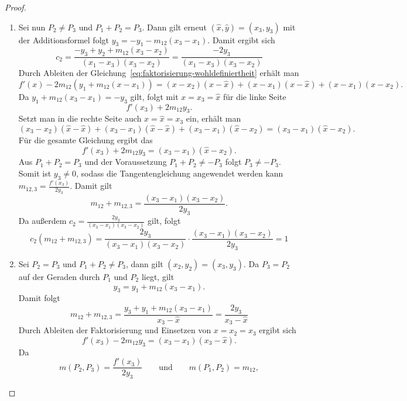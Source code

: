 \begin{proof}
\begin{enumerate}
        \item Sei nun $P_2\neq P_3$ und $P_1+P_2=P_3$. Dann gilt erneut $(\hat{x},\hat{y})=(x_3,y_3)$ mit der Additionsformel folgt $y_3=-y_1-m_{12}(x_3-x_1)$. Damit ergibt sich
              \[
                  c_2 = \frac{-y_3+y_2+m_{12}(x_3-x_2)}{(x_1-x_3)(x_3-x_2)} = \frac{-2y_3}{(x_1-x_3)(x_3-x_2)}
              \]
              Durch Ableiten der Gleichung~\eqref{eq:faktorisierung-wohldefiniertheit} erhält man
              \[
                  f'(x)-2m_{12}\left(y_1+m_{12}(x-x_1)\right)
                  =
                  (x-x_2)(x-\hat{x})
                  +(x-x_1)(x-\hat{x})
                  +(x-x_1)(x-x_2).
              \]
              Da \(y_1+m_{12}(x_3-x_1)=-y_3 \) gilt, folgt mit $x=x_3=\hat{x}$ für die linke Seite
              \[
                  f'(x_3)+2m_{12}y_3.
              \]
              Setzt man in die rechte Seite auch $x=\hat{x}=x_3$ ein, erhält man
              \[
                  (x_3-x_2)(\hat{x}-\hat{x})+(x_3-x_1)(\hat{x}-\hat{x})+(x_3-x_1)(\hat{x}-x_2)
                  = (x_3-x_1)(\hat{x}-x_2).
              \]
              Für die gesamte Gleichung ergibt das
              \[
                  f'(x_3)+2m_{12}y_3 = (x_3-x_1)(\hat{x}-x_2).
              \]
              Aus $P_1+P_2=P_3$ und der Voraussetzung $P_1+P_2\neq -P_3$ folgt $P_3\neq -P_3$. Somit ist $y_3\neq 0$, sodass die Tangentengleichung angewendet werden kann \( m_{12,3}     =\frac{f'(x_3)}{2y_3}\). Damit gilt
              \[
                  m_{12}+m_{12,3}
                  =
                  \frac{(x_3-x_1)(x_3-x_2)}{2y_3}.
              \]
              Da außerdem $ c_2= \frac{2y_3}{(x_3-x_1)(x_3-x_2)}$ gilt, folgt
              \[
                  c_2(m_{12}+m_{12,3})= \frac{2y_3}{(x_3-x_1)(x_3-x_2)}\cdot \frac{(x_3-x_1)(x_3-x_2)}{2y_3} = 1
              \]
        \item Sei $P_2=P_3$ und $P_1+P_2\neq P_3$, dann gilt $(x_2,y_2)=(x_3,y_3)$. Da $P_3=P_2$ auf der Geraden durch $P_1$ und $P_2$ liegt, gilt
              \[
                  y_3=y_1+m_{12}(x_3-x_1).
              \]
              Damit folgt
              \[
                  m_{12}+m_{12,3}=\frac{y_3+y_1+m_{12}(x_3-x_1)}{x_3-\hat{x}}= \frac{2y_3}{x_3-\hat{x}}
              \]
              Durch Ableiten der Faktorisierung und Einsetzen von $x=x_2=x_3$ ergibt sich
              \[
                  f'(x_3)-2m_{12}y_3 = (x_3-x_1)(x_3-\hat{x}).
              \]
              Da
              \[
                  m(P_2,P_3)=\frac{f'(x_3)}{2y_3}
                  \qquad\text{und}\qquad
                  m(P_1,P_2)=m_{12},
\]
\end{enumerate}
\end{proof}
